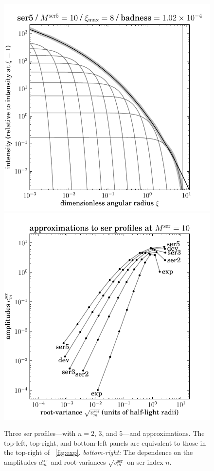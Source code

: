 \documentclass[12pt,pdftex,preprint]{aastex}
\newlength{\figurewidth}
\newcommand{\ser}{\mathrm{ser}}
\begin{document}
\begin{figure}
\includegraphics[width=\figurewidth]{ser5_K10_MR08_profile_log.pdf}%
\includegraphics[width=\figurewidth]{mixtures_vs_model_K10.pdf}
\caption{Three ser profiles---with $n=2$, $3$, and $5$---and
  approximations.  The top-left, top-right, and bottom-left panels are
  equivalent to those in the top-right of \figurename~\ref{fig:exp}.
  \textsl{bottom-right:} The dependence on the amplitudes $a^{\ser}_m$
  and root-variances $\sqrt{v^{\ser}_m}$ on ser index $n$.\label{fig:ser}}
\end{figure}
\end{document}
